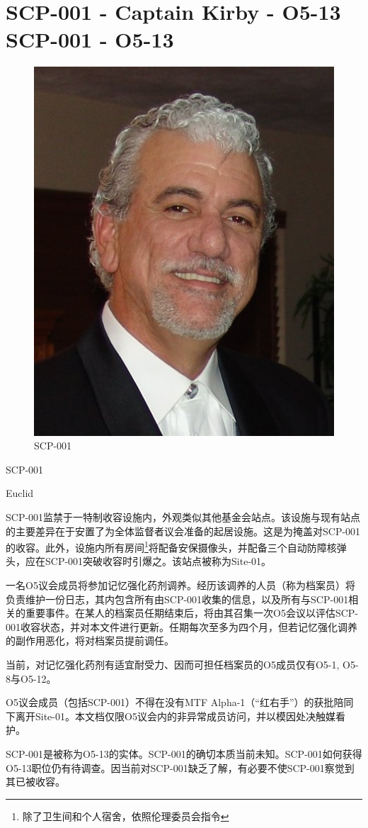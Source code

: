 \chapter[SCP-001 O5-13]{
    SCP-001 - Captain Kirby - O5-13 \\
    SCP-001 - O5-13
}

\label{chap:SCP-001.O5.13}

\begin{figure}[H]
    \centering
    \includegraphics[width=0.5\linewidth]{images/SCP-001-O5-13.png}
    \caption*{SCP-001}
\end{figure}

SCP-001

Euclid

SCP-001监禁于一特制收容设施内，外观类似其他基金会站点。该设施与现有站点的主要差异在于安置了为全体监督者议会准备的起居设施。这是为掩盖对SCP-001的收容。此外，设施内所有房间\footnote{除了卫生间和个人宿舍，依照伦理委员会指令}将配备安保摄像头，并配备三个自动防障核弹头，应在SCP-001突破收容时引爆之。该站点被称为Site-01。

一名O5议会成员将参加记忆强化药剂调养。经历该调养的人员（称为档案员）将负责维护一份日志，其内包含所有由SCP-001收集的信息，以及所有与SCP-001相关的重要事件。在某人的档案员任期结束后，将由其召集一次O5会议以评估SCP-001收容状态，并对本文件进行更新。任期每次至多为四个月，但若记忆强化调养的副作用恶化，将对档案员提前调任。

当前，对记忆强化药剂有适宜耐受力、因而可担任档案员的O5成员仅有O5-1, O5-8与O5-12。

O5议会成员（包括SCP-001）不得在没有MTF Alpha-1（“红右手”）的获批陪同下离开Site-01。本文档仅限O5议会内的非异常成员访问，并以模因处决触媒看护。

SCP-001是被称为O5-13的实体。SCP-001的确切本质当前未知。SCP-001如何获得O5-13职位仍有待调查。因当前对SCP-001缺乏了解，有必要不使SCP-001察觉到其已被收容。

